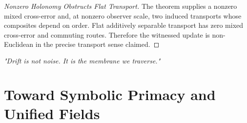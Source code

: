 \begin{proof}[Nonzero Holonomy Obstructs Flat Transport]
\label{proof:bk1_necessity_of_non_euclidean_symbolic_space}
\leavevmode
The theorem supplies a nonzero mixed cross-error and, at nonzero observer
scale, two induced transports whose composites depend on order.  Flat
additively separable transport has zero mixed cross-error and commuting routes.
Therefore the witnessed update is non-Euclidean in the precise transport sense
claimed.
\end{proof}
\begin{flushright}
\textit{"Drift is not noise. It is the membrane we traverse."}
\end{flushright}
\section{Toward Symbolic Primacy and Unified Fields}
\label{sec:bk1_toward_symbolic_primacy_and_unified_fields}
